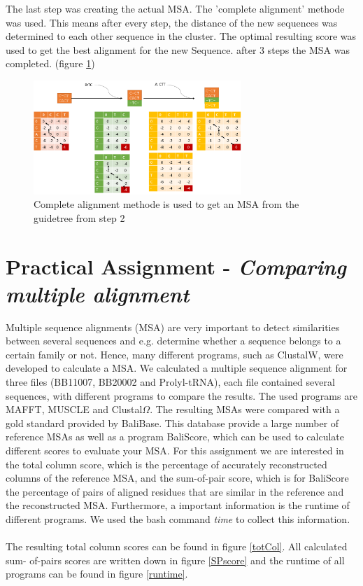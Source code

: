 \documentclass[%
   10pt,              %
   nenglish,           %
   a4paper,           %
   DIV11,             %
]{scrartcl}%
\begin{document}
The last step was creating the actual MSA. The 'complete alignment' methode was used. This means after every step, the distance of the new sequences was determined to each other sequence in the cluster. The optimal resulting score was used to get the best alignment for the new Sequence. after 3 steps the MSA was completed. (figure \ref{completealign})
\begin{figure}[ht]
        \centering
	\includegraphics[width=0.7\textwidth]{Img/Exercise2-CompleteAlignment.png}
	\caption{ Complete alignment methode is used to get an MSA from the guidetree from step 2	}
	\label{completealign}
\end{figure}


\section*{Practical Assignment - \textsl{Comparing multiple alignment}}
Multiple sequence alignments (MSA) are very important to detect similarities between several 
sequences and e.g. determine whether a sequence belongs to a certain family or not. Hence, many 
different programs, such as ClustalW, were developed to calculate a MSA. We calculated a multiple 
sequence alignment for three files (BB11007, BB20002 and Prolyl-tRNA), each file contained several 
sequences, with different programs 
to compare the results. The used programs are MAFFT\cite{Katoh1}, MUSCLE\cite{Edgar1, Edgar2} and 
Clustal$\Omega$\cite{Sievers539}. The resulting MSAs were compared with a gold standard provided by 
BaliBase\cite{Bahr1}. This database provide a large number of reference MSAs as well as a program 
\grqq BaliScore\grqq , which can be used to calculate different scores to evaluate your MSA. For 
this assignment we are interested in the total column score, which is the percentage of accurately 
reconstructed columns of the reference MSA, and the sum-of-pair score, which is for BaliScore the 
percentage of pairs of aligned residues that are similar in the reference and the reconstructed 
MSA. Furthermore, a important information is the runtime of different programs. We used the bash 
command \textit{time} to collect this information.\\
\\
\noindent The resulting total column scores can be found in figure \ref{totCol}. All calculated sum-
of-pairs scores are written down in figure \ref{SPscore} and the runtime of all programs can be found 
in figure \ref{runtime}. 
\end{document}
